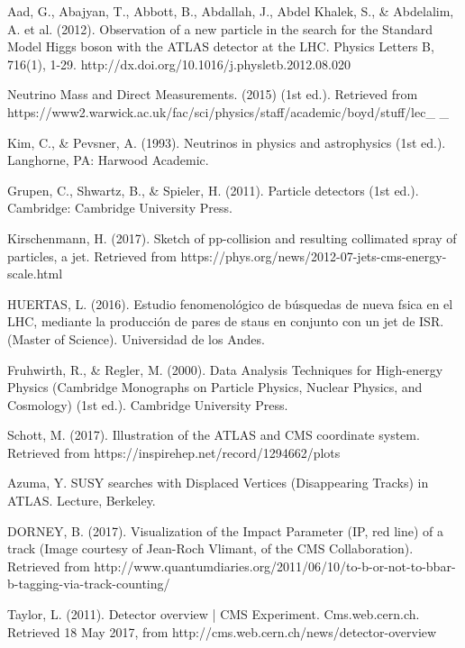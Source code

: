 \documentclass[11pt]{book}
\begin{document}
\begin{thebibliography}{10}
 Aad, G., Abajyan, T., Abbott, B., Abdallah, J., Abdel Khalek, S., \& Abdelalim, A. et al. (2012). Observation of a new particle in the search for the Standard Model Higgs boson with the ATLAS detector at the LHC. Physics Letters B, 716(1), 1-29. http://dx.doi.org/10.1016/j.physletb.2012.08.020

 Neutrino Mass and Direct Measurements. (2015) (1st ed.). Retrieved from https://www2.warwick.ac.uk/fac/sci/physics/staff/academic/boyd/stuff/lec\_ \_

 Kim, C., \& Pevsner, A. (1993). Neutrinos in physics and astrophysics (1st ed.). Langhorne, PA: Harwood Academic.

 Grupen, C., Shwartz, B., \& Spieler, H. (2011). Particle detectors (1st ed.). Cambridge: Cambridge University Press.

 Kirschenmann, H. (2017). Sketch of pp-collision and resulting collimated spray of particles, a jet. Retrieved from https://phys.org/news/2012-07-jets-cms-energy-scale.html

 HUERTAS, L. (2016). Estudio fenomenológico de búsquedas de nueva fsica en el LHC, mediante la producción de pares de staus en conjunto con un jet de ISR. (Master of Science). Universidad de los Andes.

 Fruhwirth, R., \& Regler, M. (2000). Data Analysis Techniques for High-energy Physics (Cambridge Monographs on Particle Physics, Nuclear Physics, and Cosmology) (1st ed.). Cambridge University Press.

 Schott, M. (2017). Illustration of the ATLAS and CMS coordinate system. Retrieved from https://inspirehep.net/record/1294662/plots

  Azuma, Y. SUSY searches with Displaced Vertices (Disappearing Tracks) in ATLAS. Lecture, Berkeley.

 DORNEY, B. (2017). Visualization of the Impact Parameter (IP, red line) of a track (Image courtesy of Jean-Roch Vlimant, of the CMS Collaboration). Retrieved from http://www.quantumdiaries.org/2011/06/10/to-b-or-not-to-bbar-b-tagging-via-track-counting/

 Taylor, L. (2011). Detector overview | CMS Experiment. Cms.web.cern.ch. Retrieved 18 May 2017, from http://cms.web.cern.ch/news/detector-overview


\end{thebibliography}
\end{document}
